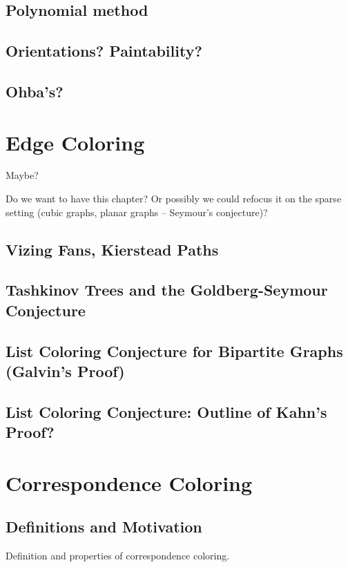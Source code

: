 \documentclass[12pt,twoside,openright,a4paper]{book}
\begin{document}
\section{Polynomial method}

\section{Orientations? Paintability?}
\section{Ohba's?}

\chapter{Edge Coloring}\label{chap:edgecol}

Maybe?

Do we want to have this chapter?  Or possibly we could refocus it on the
sparse setting (cubic graphs, planar graphs -- Seymour's conjecture)?

\section{Vizing Fans, Kierstead Paths}
\section{Tashkinov Trees and the Goldberg-Seymour Conjecture}\label{sec:goseycon}
\section{List Coloring Conjecture for Bipartite Graphs (Galvin's Proof)}
\section{List Coloring Conjecture: Outline of Kahn's Proof?}

\chapter{Correspondence Coloring}\label{chap:corresp}


\section{Definitions and Motivation}

Definition and properties of correspondence coloring.
\end{document}

